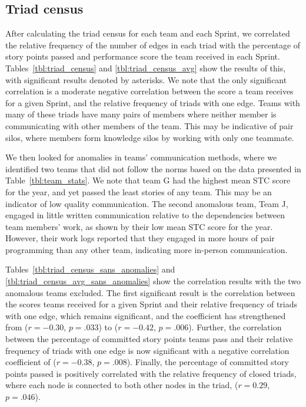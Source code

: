 \subsection{Triad census}
After calculating the triad census for each team and each Sprint, we correlated the relative frequency of the number of edges in each triad with the percentage of story points passed and performance score the team received in each Sprint.
Tables~\ref{tbl:triad_census} and \ref{tbl:triad_census_avg} show the results of this, with significant results denoted by asterisks. We note that the only significant correlation is a moderate negative correlation between the score a team receives for a given Sprint, and the relative frequency of triads with one edge. Teams with many of these triads have many pairs of members where neither member is communicating with other members of the team. This may be indicative of pair silos, where members form knowledge silos by working with only one teammate.



We then looked for anomalies in teams' communication methods, where we identified two teams that did not follow the norms based on the data presented in Table~\ref{tbl:team_stats}. We note that team G had the highest mean STC score for the year, and yet passed the least stories of any team. This may be an indicator of low quality communication. The second anomalous team, Team J, engaged in little written communication relative to the dependencies between team members' work, as shown by their low mean STC score for the year. However, their work logs reported that they engaged in more hours of pair programming than any other team, indicating more in-person communication.



Tables~\ref{tbl:triad_census_sans_anomalies} and \ref{tbl:triad_census_avg_sans_anomalies} show the correlation results with the two anomalous teams excluded. The first significant result is the correlation between the scores teams received for a given Sprint and their relative frequency of triads with one edge, which remains significant, and the coefficient has strengthened from ($r = -0.30$, $p = .033$) to ($r = -0.42$, $p = .006$). Further, the correlation between the percentage of committed story points teams pass and their relative frequency of triads with one edge is now significant with a negative correlation coefficient of ($r = -0.38$, $p = .008$). Finally, the percentage of committed story points passed is positively correlated with the relative frequency of closed triads, where each node is connected to both other nodes in the triad, ($r = 0.29$, $p = .046$).

